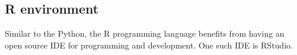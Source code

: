 \subsection{R environment}
\label{sec:mesre}
Similar to the Python, the R programming language benefits from having an open source IDE for programming and development.  
One such IDE is RStudio\footnotemark. 
